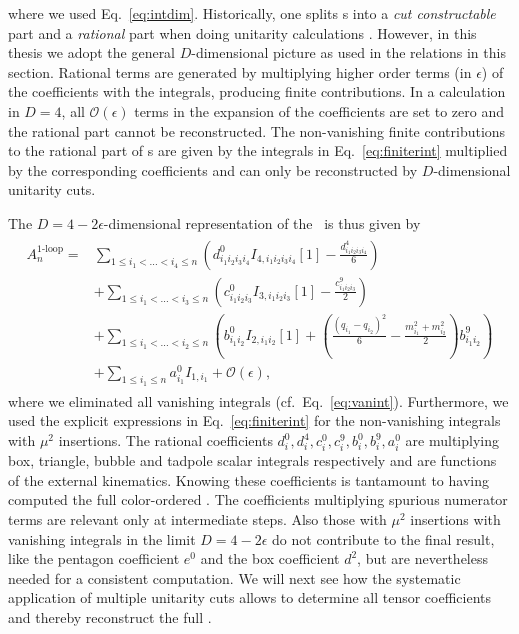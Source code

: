 where we used Eq.~\eqref{eq:intdim}. Historically, one splits \ola s into a \textit{cut constructable}
part and a \textit{rational} part when doing unitarity
calculations \cite{Bern:1994zx,Bern:1994cg}. However, in this thesis we adopt the general $D$-dimensional picture as used in the relations in this section. Rational terms are generated by multiplying higher order terms (in
$\epsilon$) of the coefficients with the integrals, producing finite
contributions. In a calculation in $D=4$, all $\mathcal{O}(\epsilon)$
terms in the expansion of the coefficients are set to zero and the
rational part cannot be reconstructed. The
non-vanishing finite contributions to the rational part of \ola s are given by the integrals in
Eq.~\eqref{eq:finiterint} multiplied by the corresponding
coefficients and can only be reconstructed by $D$-dimensional
unitarity cuts. 

The $D=4-2\epsilon$-dimensional representation of the \ola~is thus given by
\begin{align}
\begin{split}
 A_n^{\text{1-loop}}=&\sum_{1\le
   i_1 < \dots < i_4 \le
   n}  \left( d^0_{i_1i_2i_3i_4} I_{4,i_1i_2i_3i_4}[1]-\frac{d^4_{i_1i_2i_3i_4}}{6}\right)\\
&+\sum_{1\le i_1 < \dots < i_3 \le n}\left(c^0_{i_1i_2i_3}
  I_{3,i_1i_2i_3}[1]-\frac{c^9_{i_1i_2i_3}}{2} \right)\\
&+\sum_{1\le i_1
  < \dots < i_2 \le n}\left(b^0_{i_1i_2}
  I_{2,i_1i_2}[1]+\left(\frac{(q_{i_1}-q_{i_2})^2}{6}-\frac{m_{i_1}^2+m_{i_2}^2}{2}\right)b^9_{i_1i_2}
\right)\\
&+\sum_{1\le i_1 \le n} a^0_{i_1}I_{1,i_1} + \mathcal{O}(\epsilon),
\end{split}
\end{align}
where we eliminated all vanishing integrals
(cf.~Eq.~\eqref{eq:vanint}). Furthermore, we used the explicit expressions in
Eq.~\eqref{eq:finiterint} for the non-vanishing integrals with $\mu^2$
insertions. The rational coefficients $d_i^0,d_i^4,c_i^0,c_i^9,b_i^0,b^9_i,a_i^0$ are multiplying box, triangle, bubble and tadpole scalar integrals
respectively and are functions of the external kinematics. Knowing these coefficients is tantamount to having
computed the full color-ordered \ola. The coefficients multiplying
spurious numerator terms are relevant only at intermediate steps. Also
those with $\mu^2$ insertions with vanishing integrals in the limit
$D=4-2\epsilon$ do not contribute to the final result, like the pentagon
coefficient $e^0$ and the box coefficient $d^2$, but are nevertheless
needed for a consistent computation. We will next see how the systematic application of multiple unitarity
cuts allows to determine all tensor coefficients and thereby
reconstruct the full \ola.



